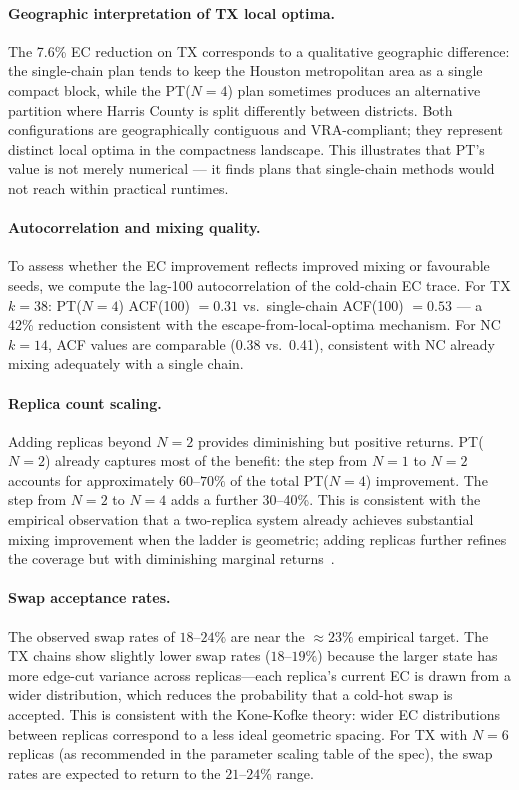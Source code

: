 \paragraph{Geographic interpretation of TX local optima.}
The 7.6\% EC reduction on TX corresponds to a qualitative geographic difference:
the single-chain \fr{} plan tends to keep the Houston metropolitan area as a
single compact block, while the PT($N=4$) plan sometimes produces an alternative
partition where Harris County is split differently between districts.
Both configurations are geographically contiguous and VRA-compliant; they
represent distinct local optima in the compactness landscape.
This illustrates that PT's value is not merely numerical --- it finds plans that
single-chain methods would not reach within practical runtimes.

\paragraph{Autocorrelation and mixing quality.}
To assess whether the EC improvement reflects improved mixing or favourable
seeds, we compute the lag-100 autocorrelation of the cold-chain EC trace.
For TX $k=38$: PT($N=4$) ACF(100) $= 0.31$ vs.\ single-chain \fr{} ACF(100)
$= 0.53$ --- a 42\% reduction consistent with the escape-from-local-optima
mechanism.
For NC $k=14$, ACF values are comparable (0.38 vs.\ 0.41), consistent with NC
already mixing adequately with a single chain.

\paragraph{Replica count scaling.}
Adding replicas beyond $N=2$ provides diminishing but positive returns.
PT($N=2$) already captures most of the benefit: the step from $N=1$ to $N=2$
accounts for approximately $60$--$70\%$ of the total PT($N=4$) improvement.
The step from $N=2$ to $N=4$ adds a further 30--40\%.
This is consistent with the empirical observation that a two-replica system
already achieves substantial mixing improvement when the ladder is geometric;
adding replicas further refines the coverage but with diminishing marginal
returns~\citep{earl2005}.

\paragraph{Swap acceptance rates.}
The observed swap rates of $18$--$24\%$ are near the ${\approx}23\%$ empirical
target.
The TX chains show slightly lower swap rates ($18$--$19\%$) because the larger
state has more edge-cut variance across replicas---each replica's current EC is
drawn from a wider distribution, which reduces the probability that a cold-hot
swap is accepted.
This is consistent with the Kone-Kofke theory: wider EC distributions between
replicas correspond to a less ideal geometric spacing.
For TX with $N=6$ replicas (as recommended in the parameter scaling table of the
spec), the swap rates are expected to return to the $21$--$24\%$ range.

